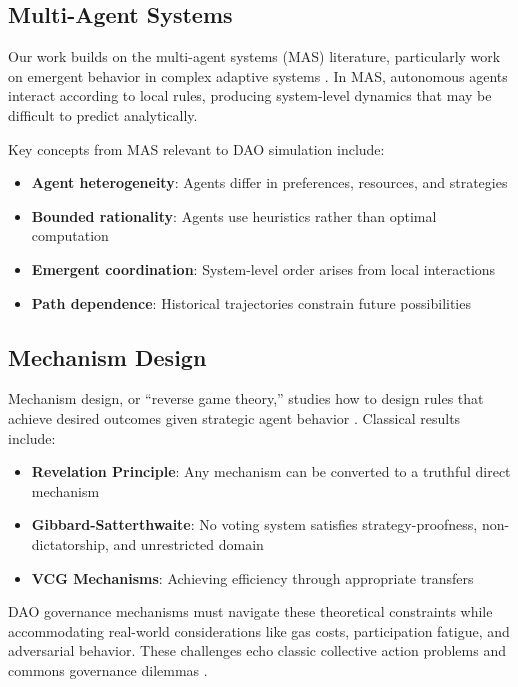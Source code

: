 \subsection{Multi-Agent Systems}

Our work builds on the multi-agent systems (MAS) literature, particularly work on emergent behavior in complex adaptive systems \citep{wooldridge2009introduction}. In MAS, autonomous agents interact according to local rules, producing system-level dynamics that may be difficult to predict analytically.

Key concepts from MAS relevant to DAO simulation include:
\begin{itemize}
    \item \textbf{Agent heterogeneity}: Agents differ in preferences, resources, and strategies
    \item \textbf{Bounded rationality}: Agents use heuristics rather than optimal computation
    \item \textbf{Emergent coordination}: System-level order arises from local interactions
    \item \textbf{Path dependence}: Historical trajectories constrain future possibilities
\end{itemize}

\subsection{Mechanism Design}

Mechanism design, or ``reverse game theory,'' studies how to design rules that achieve desired outcomes given strategic agent behavior \citep{nisan2007algorithmic}. Classical results include:

\begin{itemize}
    \item \textbf{Revelation Principle}: Any mechanism can be converted to a truthful direct mechanism
    \item \textbf{Gibbard-Satterthwaite}: No voting system satisfies strategy-proofness, non-dictatorship, and unrestricted domain \citep{gibbard1973manipulation, satterthwaite1975strategy}
    \item \textbf{VCG Mechanisms}: Achieving efficiency through appropriate transfers
\end{itemize}

DAO governance mechanisms must navigate these theoretical constraints while accommodating real-world considerations like gas costs, participation fatigue, and adversarial behavior. These challenges echo classic collective action problems \citep{olson1965logic} and commons governance dilemmas \citep{ostrom1990governing}.

